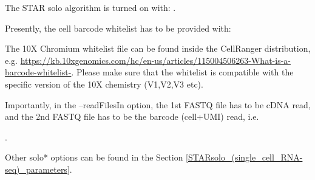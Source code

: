 \documentclass[12pt]{article}
\begin{document}
The STAR solo algorithm is turned on with:  . 

Presently, the cell barcode whitelist has to be provided with:

 

The 10X Chromium whitelist file can be found inside the CellRanger distribution, e.g. \url{https://kb.10xgenomics.com/hc/en-us/articles/115004506263-What-is-a-barcode-whitelist-}. Please make sure that the whitelist is compatible with the specific version of the 10X chemistry (V1,V2,V3 etc).

Importantly, in the --readFilesIn option, the 1st FASTQ file has to be cDNA read, and the 2nd FASTQ file has to be the barcode (cell+UMI) read, i.e. 

 .

Other solo* options can be found in the Section \ref{STARsolo_(single_cell_RNA-seq)_parameters}.
\end{document}
